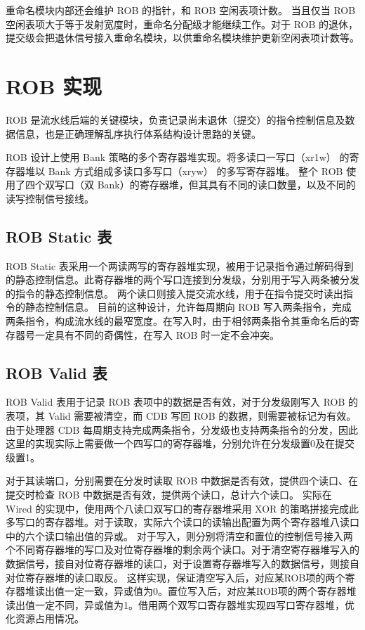 重命名模块内部还会维护 ROB 的指针，和 ROB 空闲表项计数。 当且仅当 ROB 空闲表项大于等于发射宽度时，重命名分配级才能继续工作。对于 ROB 的退休，提交级会把退休信号接入重命名模块，以供重命名模块维护更新空闲表项计数等。

\section{ROB 实现}\label{sec:05-complex-cpu-005}

ROB 是流水线后端的关键模块，负责记录尚未退休（提交）的指令控制信息及数据信息，也是正确理解乱序执行体系结构设计思路的关键。

ROB 设计上使用 Bank 策略的多个寄存器堆实现。将多读口一写口（xr1w） 的寄存器堆以 Bank 方式组成多读口多写口（xryw） 的多写寄存器堆。 整个 ROB 使用了四个双写口（双 Bank）的寄存器堆，但其具有不同的读口数量，以及不同的读写控制信号接线。

\subsection{ROB Static 表}\label{sec:05-complex-cpu-006}

ROB Static 表采用一个两读两写的寄存器堆实现，被用于记录指令通过解码得到的静态控制信息。此寄存器堆的两个写口连接到分发级，分别用于写入两条被分发的指令的静态控制信息。 两个读口则接入提交流水线，用于在指令提交时读出指令的静态控制信息。 目前的这种设计，允许每周期向 ROB 写入两条指令，完成两条指令，构成流水线的最窄宽度。在写入时，由于相邻两条指令其重命名后的寄存器号一定具有不同的奇偶性，在写入 ROB 时一定不会冲突。

\subsection{ROB Valid 表}\label{sec:05-complex-cpu-007}

ROB Valid 表用于记录 ROB 表项中的数据是否有效，对于分发级刚写入 ROB 的表项，其 Valid 需要被清空，而 CDB 写回 ROB 的数据，则需要被标记为有效。 由于处理器 CDB 每周期支持完成两条指令，分发级也支持两条指令的分发，因此这里的实现实际上需要做一个四写口的寄存器堆，分别允许在分发级置0及在提交级置1。

对于其读端口，分别需要在分发时读取 ROB 中数据是否有效，提供四个读口、在提交时检查 ROB 中数据是否有效，提供两个读口，总计六个读口。 实际在 Wired 的实现中，使用两个八读口双写口的寄存器堆采用 XOR 的策略拼接完成此多写口的寄存器堆。对于读取，实际六个读口的读输出配置为两个寄存器堆八读口中的六个读口输出值的异或。 对于写入，则分别将清空和置位的控制信号接入两个不同寄存器堆的写口及对位寄存器堆的剩余两个读口。对于清空寄存器堆写入的数据信号，接自对位寄存器堆的读口，对于设置寄存器堆写入的数据信号，则接自对位寄存器堆的读口取反。 这样实现，保证清空写入后，对应某ROB项的两个寄存器堆读出值一定一致，异或值为0。置位写入后，对应某ROB项的两个寄存器堆读出值一定不同，异或值为1。借用两个双写口寄存器堆实现四写口寄存器堆，优化资源占用情况。

